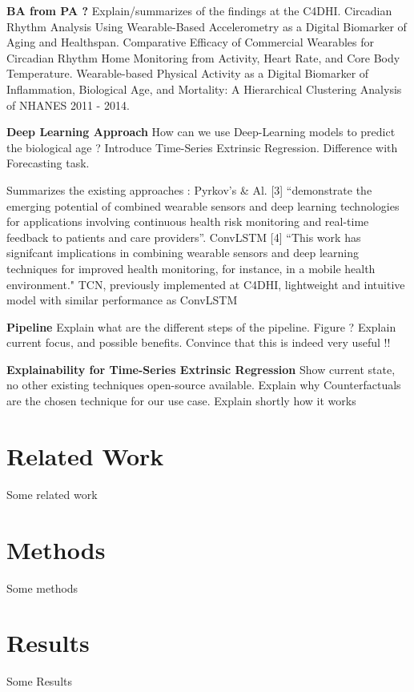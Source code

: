 \documentclass[5p,times]{elsarticle}
\begin{document}
\textbf{BA from PA ?} Explain/summarizes of the findings at the C4DHI.
Circadian Rhythm Analysis Using Wearable-Based Accelerometry as a Digital Biomarker of Aging and Healthspan.
Comparative Efficacy of Commercial Wearables for Circadian Rhythm Home Monitoring from Activity, Heart Rate, and Core Body Temperature. Wearable-based Physical Activity as a Digital Biomarker of Inflammation, Biological Age, and Mortality: A Hierarchical Clustering Analysis of NHANES 2011 - 2014.


\textbf{Deep Learning Approach} How can we use Deep-Learning models to predict the biological age ? Introduce Time-Series Extrinsic Regression. Difference with Forecasting task.

Summarizes the existing approaches :
Pyrkov’s \& Al. [3] “demonstrate the emerging potential of combined wearable sensors and deep learning technologies for applications involving continuous health risk monitoring and real-time feedback to patients and care providers”. ConvLSTM [4] “This work has signifcant implications in combining wearable sensors and deep learning techniques for improved health monitoring, for instance, in a mobile health environment." TCN, previously implemented at C4DHI, lightweight and intuitive model with similar performance as ConvLSTM

\textbf{Pipeline} Explain what are the different steps of the pipeline. Figure ? Explain current focus, and possible benefits. Convince that this is indeed very useful !!

\textbf{Explainability for Time-Series Extrinsic Regression} Show current state, no other existing techniques open-source available. Explain why Counterfactuals are the chosen technique for our use case. Explain shortly how it works




\section{Related Work}
\label{sec:related-work}
Some related work

\section{Methods}
\label{sec:methods}
Some methods

\section{Results}
\label{sec:results}
Some Results
\end{document}
